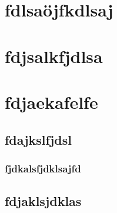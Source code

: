 \documentclass[12pt,12pt,a4paper,oneside,bibliography=totoc]{scrbook}
\begin{document}
\section{fdlsaöjfkdlsaj}\label{fdlsauxf6jfkdlsaj}

\section{fdjsalkfjdlsa}\label{fdjsalkfjdlsa}

\section{fdjaekafelfe}\label{fdjaekafelfe}

\subsection{fdajkslfjdsl}\label{fdajkslfjdsl}

\subsubsection{fjdkalsfjdklsajfd}\label{fjdkalsfjdklsajfd}

\subsection{fdjaklsjdklas}\label{fdjaklsjdklas}


  \printbibliography

\backmatter

  
\end{document}
